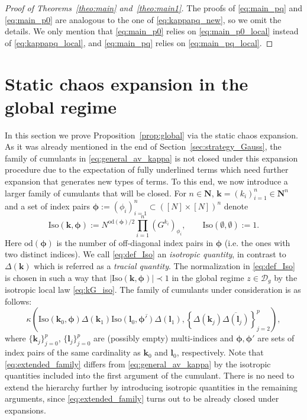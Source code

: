 \documentclass[10pt]{amsart}
\numberwithin{equation}{section}
\newcommand{\N}{\mathbf{N}}
\begin{document}
\begin{proof}[Proof of Theorems~\ref{theo:main} and~\ref{theo:main1}]
The proofs of \eqref{eq:main_pq} and \eqref{eq:main_p0} are analogous to the one of \eqref{eq:kappapq_new}, so we omit  the details. We only mention that \eqref{eq:main_p0} relies on \eqref{eq:main_p0_local} instead of \eqref{eq:kappapq_local}, and \eqref{eq:main_pq} relies on \eqref{eq:main_pq_local}.
\end{proof}


\section{ Static chaos expansion in the global regime}\label{sec:global}

In this section we prove Proposition~\ref{prop:global} via the static chaos expansion. As it was already mentioned in the end of Section~\ref{sec:strategy_Gauss}, the family of cumulants  in \eqref{eq:general_av_kappa} is not closed under this expansion procedure due to the expectation of fully underlined terms which need further expansion that generates new types of terms. To this end, we now introduce a larger family of cumulants that will be closed. For $n\in\N$, $\bm{k}=(k_i)_{i=1}^n\in \N^n$ and a set of index pairs $\bm{\phi}:=(\phi_i)_{i=1}^n\subset ([N]\times[N])^n$ denote
\begin{equation}
\mathrm{Iso}(\bm{k},\bm{\phi}):=N^{\mathrm{od}(\bm{\phi})/2}\prod_{i=1}^n (G^{k_i})_{\phi_i},\qquad \mathrm{Iso}(\emptyset,\emptyset):=1.
\label{eq:def_Iso}
\end{equation} 
Here $\mathrm{od}(\bm{\phi})$ is the number of off-diagonal index pairs in $\bm{\phi}$ (i.e. the ones with two distinct indices). We call \eqref{eq:def_Iso} an \emph{isotropic quantity}, in contrast to $\Delta(\bm{k})$ which is referred as a \emph{tracial quantity}. The normalization in \eqref{eq:def_Iso} is chosen in such a way that $\left\vert\mathrm{Iso}(\bm{k},\bm{\phi})\right\vert\prec 1$ in the global regime $z\in\mathcal{D}_g$ by the isotropic local law \eqref{eq:kG_iso}. The family of cumulants under consideration is as follows:
\begin{equation}
\kappa\left(\mathrm{Iso}(\bm{k}_0,\bm{\phi})\Delta(\bm{k}_1)\overline{\mathrm{Iso}(\bm{l}_0,\bm{\phi}')\Delta(\bm{l}_1)}, \left\lbrace \Delta(\bm{k}_j)\overline{\Delta(\bm{l}_j)}\right\rbrace_{j=2}^p\right),
\label{eq:extended_family}
\end{equation}
where $\{\bm{k}_j\}_{j=0}^p$, $\{\bm{l}_j\}_{j=0}^p$ are (possibly empty) multi-indices and $\bm{\phi}, \bm{\phi}'$ are sets of index pairs of the same cardinality as $\bm{k}_0$ and $\bm{l}_0$, respectively.  Note that \eqref{eq:extended_family} differs from \eqref{eq:general_av_kappa} by the isotropic quantities included into the first argument of the cumulant. There is no need to extend the hierarchy further by introducing isotropic quantities in the remaining arguments, since \eqref{eq:extended_family} turns out to be  already closed under expansions.
\end{document}
